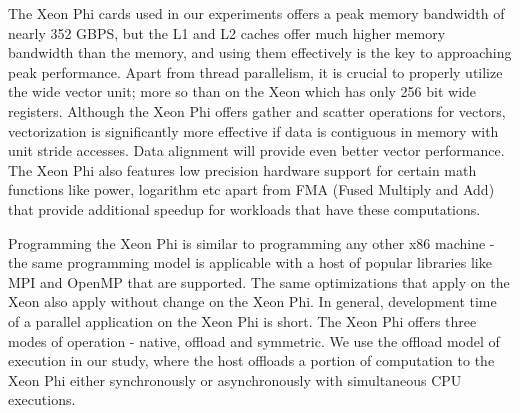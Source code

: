 The Xeon Phi cards used in our experiments offers a peak memory bandwidth of nearly 352 GBPS, but the L1 and L2 caches offer much higher memory bandwidth than the memory, and using them effectively is the key to approaching peak performance. Apart from thread parallelism, it is crucial to properly utilize the wide vector unit; more so than on the Xeon which has only 256 bit wide registers. Although the Xeon Phi offers gather and scatter operations for vectors, vectorization is significantly more effective if data is contiguous in memory with unit stride accesses. Data alignment will provide even better vector performance. The Xeon Phi also features low precision hardware support for certain math functions like power, logarithm etc apart from FMA (Fused Multiply and Add) that provide additional speedup for workloads that have these computations.

Programming the Xeon Phi is similar to programming any other x86 machine - the same programming model is applicable with a host of popular libraries like MPI and OpenMP that are supported. The same optimizations that apply on the Xeon also apply without change on the Xeon Phi. In general, development time of a parallel application on the Xeon Phi is short.  The Xeon Phi offers three modes of operation - native, offload and symmetric. We use the offload model of execution in our study, where the host offloads a portion of computation to the Xeon Phi either synchronously or asynchronously with simultaneous CPU executions.
